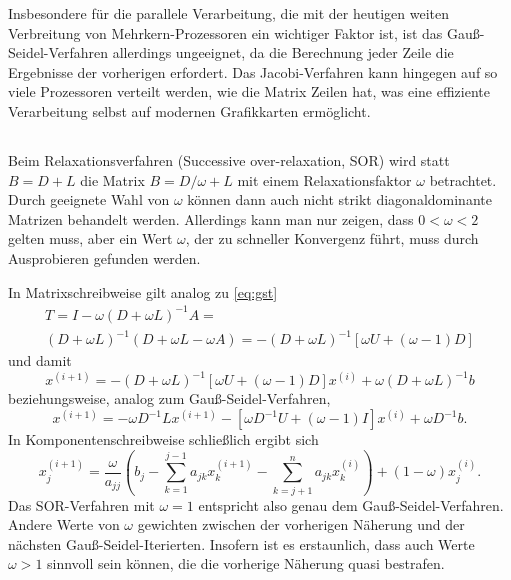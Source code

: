 Insbesondere für die parallele Verarbeitung, die mit der heutigen
weiten Verbreitung von Mehrkern-Prozessoren ein wichtiger Faktor ist,
ist das Gauß-Seidel-Verfahren allerdings ungeeignet, da die Berechnung
jeder Zeile die Ergebnisse der vorherigen erfordert. Das
Jacobi-Verfahren kann hingegen auf so viele Prozessoren verteilt
werden, wie die Matrix Zeilen hat, was eine effiziente Verarbeitung
selbst auf modernen Grafikkarten ermöglicht.

\subsection{}

Beim Relaxationsverfahren (Successive over-relaxation, SOR) wird statt
$B = D + L$ die Matrix $B = D/\omega + L$ mit einem Relaxationsfaktor
$\omega$ betrachtet. Durch geeignete Wahl von $\omega$ können dann
auch nicht strikt diagonaldominante Matrizen behandelt
werden. Allerdings kann man nur zeigen, dass $0<\omega< 2$ gelten
muss, aber ein Wert $\omega$, der zu schneller Konvergenz führt, muss
durch Ausprobieren gefunden werden.

In Matrixschreibweise gilt analog zu \eqref{eq:gst}
\begin{multline}
  T = I - \omega(D + \omega L)^{-1} A =\\
  (D + \omega L)^{-1}(D + \omega L - \omega A) = -(D+\omega L)^{-1}
  \left[\omega U + (\omega-1) D\right]
\end{multline}
und damit
\begin{equation}
  x^{(i+1)} = -(D+\omega L)^{-1}
  \left[\omega U + (\omega-1) D\right]x^{(i)} +
  \omega(D + \omega L)^{-1} b
\end{equation}
beziehungsweise, analog zum Gauß-Seidel-Verfahren,
\begin{equation}
  x^{(i+1)} = -\omega D^{-1}L x^{(i+1)}
  -\left[\omega D^{-1}U + (\omega-1)I\right]x^{(i)} +
  \omega D^{-1}b.
\end{equation}
In Komponentenschreibweise schließlich ergibt sich
\begin{equation}
  x_j^{(i+1)} = \frac{\omega}{a_{jj}}\left(
    b_j
    - \sum_{k=1}^{j-1} a_{jk} x_k^{(i+1)}
    - \sum_{k=j+1}^{n} a_{jk} x_k^{(i)}\right)
  + (1-\omega) x_j^{(i)}.
\end{equation}
Das SOR-Verfahren mit $\omega=1$ entspricht also genau dem
Gauß-Seidel-Verfahren. Andere Werte von $\omega$ gewichten zwischen
der vorherigen Näherung und der nächsten
Gauß-Seidel-Iterierten. Insofern ist es erstaunlich, dass auch Werte
$\omega>1$ sinnvoll sein können, die die vorherige Näherung quasi
bestrafen.

